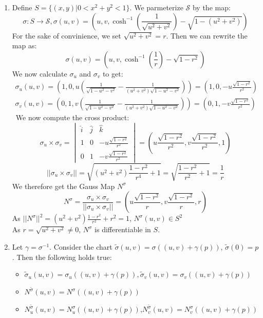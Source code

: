 \documentclass{article}
\begin{document}
\begin{enumerate}
    \item Define $S=\{(x,y)|0<x^2+y^2<1\}$. We parmeterize $\mathscr{S}$ by the map:
            $$\sigma:S\to\mathscr{S},\sigma(u,v)=(u,v,\cosh^{-1}\left(\frac{1}{\sqrt{u^2+v^2}}\right)-\sqrt{1-(u^2+v^2)})$$
        For the sake of convinience, we set $\sqrt{u^2+v^2}=r$. Then we can rewrite the map as:
            $$\sigma(u,v)=(u,v,\cosh^{-1}{\left(\frac{1}{r}\right)}-\sqrt{1-r^2})$$
        We now calculate $\sigma_u$ and $\sigma_v$ to get:
        \begin{align*}
            \sigma_u(u,v)=\left(1,0,u\left(\frac{1}{\sqrt{1-u^2-v^2}}-\frac{1}{(u^2+v^2)\sqrt{1-u^2-v^2}}\right)\right)=\left(1,0,-u\frac{\sqrt{1-r^2}}{r^2}\right)\\
            \sigma_v(u,v)=\left(0,1,v\left(\frac{1}{\sqrt{1-u^2-v^2}}-\frac{1}{(u^2+v^2)\sqrt{1-u^2-v^2}}\right)\right)=\left(0,1,-v\frac{\sqrt{1-r^2}}{r^2}\right)
        \end{align*}\
        We now compute the cross product:
            $$\sigma_u\times \sigma_v= \begin{vmatrix}
            \hat{i} & \hat{j} & \hat{k} \\
            1 & 0 & -u\frac{\sqrt{1-r^2}}{r^2} \\
            0 & 1 & -v\frac{\sqrt{1-r^2}}{r^2}
            \end{vmatrix}=\left(u\frac{\sqrt{1-r^2}}{r^2},v\frac{\sqrt{1-r^2}}{r^2},1\right)  $$
            $$||\sigma_u\times \sigma_v||=\sqrt{(u^2+v^2)\frac{{1-r^2}}{r^4}+1}=\sqrt{\frac{1-r^2}{r^2}+1}=\frac{1}{r}$$
        We therefore get the Gauss Map $N^\sigma$
            $$N^\sigma=\frac{\sigma_u\times \sigma_v}{||\sigma_u\times \sigma_v||}=\left(u\frac{\sqrt{1-r^2}}{r},v\frac{\sqrt{1-r^2}}{r},r\right)$$
        As $||N^{\sigma}||^2=(u^2+v^2)\frac{1-r^2}{r^2}+r^2=1$, $N^\sigma(u,v)\in S^2$\\
        As $r=\sqrt{u^2+v^2}\ne0$, $N^{\sigma}$ is differentiable in $S$.  
        \item  Let $\gamma=\sigma^{-1}$. Consider the chart $\tilde{\sigma}(u,v)=\sigma\left((u,v)+\gamma(p)\right)$, $\tilde\sigma(0)=p$. Then the following holds true:
        \begin{itemize}
            \item $\tilde\sigma_u(u,v)=\sigma_u((u,v)+\gamma(p)),\tilde\sigma_v(u,v)=\sigma_v((u,v)+\gamma(p))$
            \item $N^{\tilde{\sigma}}(u,v)=N^{\sigma}((u,v)+\gamma(p))$
            \item $N^{\tilde{\sigma}}_u(u,v)=N^{\sigma}_u((u,v)+\gamma(p))$,$N^{\tilde{\sigma}}_v(u,v)=N^{\sigma}_v((u,v)+\gamma(p))$

\end{itemize}
\end{enumerate}
\end{document}
